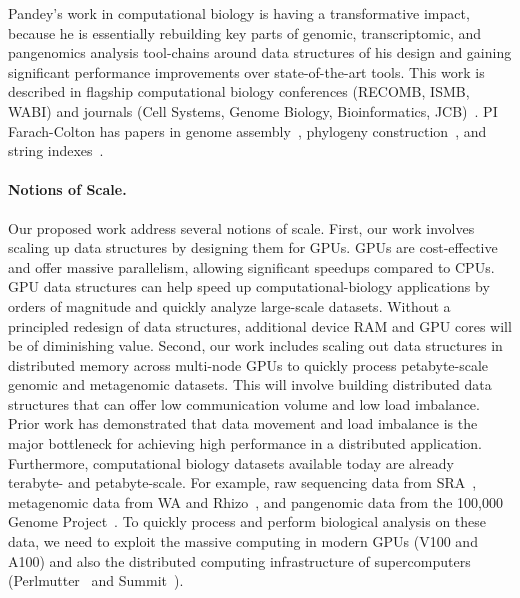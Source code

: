 \begin{description}
    \item[Large-scale computational biology (PIs Bender, Farach-Colton, and Pandey)] Pandey's work in computational biology is having a transformative impact, because he is essentially rebuilding key parts of genomic, transcriptomic, and pangenomics analysis tool-chains around data structures of his design and gaining significant performance improvements over state-of-the-art tools.
    This work is described in flagship computational biology conferences (RECOMB, ISMB, WABI) and journals (Cell Systems, Genome Biology, Bioinformatics, JCB)~\cite{PandeyABFJP18Cell,PandeyBJP17a,PandeyBJP17b,AlmodaresiPFJP19,AlmodaresiPFJP20,pandey2021variantstore,almodaresi2017rainbowfish,almodaresi2022incrementally}.  PI Farach-Colton has papers in genome assembly~\cite{Choi2003}, phylogeny construction~\cite{Farach97,Ambainis97,FarachKKM97,Farach1999, Cohen1997}, and string indexes~\cite{Farach97,Ambainis97}.

\end{description}


\paragraph{Notions of Scale.}
Our proposed work address several notions of scale.
First, our work involves scaling up data structures by designing them for GPUs. GPUs are cost-effective and offer massive parallelism, allowing significant speedups compared to CPUs. GPU data structures can help speed up computational-biology applications by orders of magnitude  and quickly analyze large-scale datasets. Without a principled redesign of data structures, additional device RAM and GPU cores will be of diminishing value.
Second, our work includes scaling out data structures in distributed memory across multi-node GPUs to quickly process petabyte-scale genomic and metagenomic datasets. This will involve building distributed data structures that can offer low communication volume and low load imbalance. Prior work has demonstrated that data movement and load imbalance is the major bottleneck for achieving high performance in a distributed application.
Furthermore, computational biology datasets available today are already terabyte- and petabyte-scale. For example, raw sequencing data from SRA~\cite{kodama2012sequence}, metagenomic data from WA and Rhizo~\cite{hofmeyr2020terabase}, and pangenomic data from the 100,000 Genome Project~\cite{1002021100}.  To quickly process and perform biological analysis on these data, we need to exploit the massive computing in modern GPUs (V100 and A100) and also the distributed computing infrastructure of supercomputers (Perlmutter~\cite{perlmutter} and Summit~\cite{summit}).
